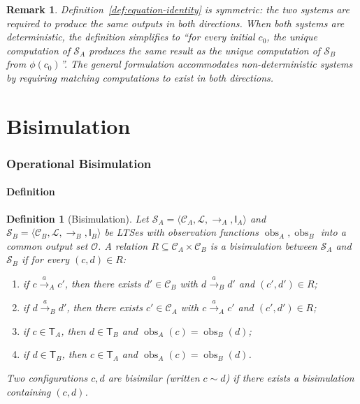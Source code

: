 \documentclass[twocolumn,11pt,a4paper]{article}
\newtheorem{definition}[theorem]{Definition}
\newtheorem{remark}[theorem]{Remark}
\DeclareMathOperator{\obs}{obs}
\newcommand{\Conf}{\mathcal{C}}
\newcommand{\Lab}{\mathcal{L}}
\newcommand{\Term}{\mathsf{T}}
\newcommand{\Init}{\mathsf{I}}
\newcommand{\Out}{\mathcal{O}}
\newcommand{\Sys}{\mathcal{S}}
\newcommand{\bisim}{\sim}
\begin{document}
\begin{remark}
Definition~\ref{def:equation-identity} is symmetric: the two systems are required to produce the same outputs in both directions. When both systems are deterministic, the definition simplifies to ``for every initial $c_0$, the unique computation of $\Sys_A$ produces the same result as the unique computation of $\Sys_B$ from $\phi(c_0)$''. The general formulation accommodates non-deterministic systems by requiring matching computations to exist in both directions.
\end{remark}

\part{Bisimulation}

\section{Operational Bisimulation}
\label{sec:bisimulation}

\subsection{Definition}

\begin{definition}[Bisimulation]
\label{def:bisimulation}
Let $\Sys_A = \langle \Conf_A, \Lab, \to_A, \Init_A \rangle$ and $\Sys_B = \langle \Conf_B, \Lab, \to_B, \Init_B \rangle$ be LTSes with observation functions $\obs_A, \obs_B$ into a common output set $\Out$. A relation $R \subseteq \Conf_A \times \Conf_B$ is a \emph{bisimulation} between $\Sys_A$ and $\Sys_B$ if for every $(c, d) \in R$:
\begin{enumerate}[nosep,leftmargin=*,label=(B\arabic*)]
\item if $c \xrightarrow{a}_A c'$, then there exists $d' \in \Conf_B$ with $d \xrightarrow{a}_B d'$ and $(c', d') \in R$;
\item if $d \xrightarrow{a}_B d'$, then there exists $c' \in \Conf_A$ with $c \xrightarrow{a}_A c'$ and $(c', d') \in R$;
\item if $c \in \Term_A$, then $d \in \Term_B$ and $\obs_A(c) = \obs_B(d)$;
\item if $d \in \Term_B$, then $c \in \Term_A$ and $\obs_A(c) = \obs_B(d)$.
\end{enumerate}
Two configurations $c, d$ are \emph{bisimilar} (written $c \bisim d$) if there exists a bisimulation containing $(c, d)$.
\end{definition}
\end{document}

